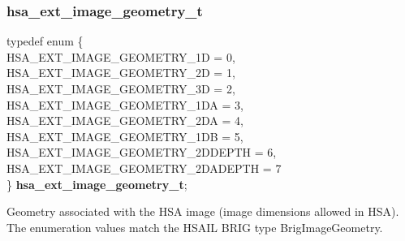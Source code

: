 \documentclass[final]{book}
\newcommand{\reftyp}[1]{#1}
\newcommand{\refenu}[1]{\reftyp{#1}}
\newenvironment{mylongtable}{\rowcolors{0}{lightgray}{lightgray}\longtable} {
\endlongtable}
\begin{document}
\subsubsection{hsa_\-ext_\-image_\-geometry_\-t}
\vspace{-5.5mm}\begin{mylongtable}{@{}p{\textwidth}}
\rule{0pt}{3ex}typedef enum \{\\\hspace{1.7em}\hypertarget{group__ext-images_1ggac61587d98a80d1660378e3904a66fc9caa025ea993dbfe3101d3ff0caea2ea0cf}{\refenu{HSA_\-EXT_\-IMAGE_\-GEOMETRY_\-1D}} = 0,\\
\hspace{1.7em}\hypertarget{group__ext-images_1ggac61587d98a80d1660378e3904a66fc9ca4bcc28ccad5a32bd9c9dbf203da4464e}{\refenu{HSA_\-EXT_\-IMAGE_\-GEOMETRY_\-2D}} = 1,\\
\hspace{1.7em}\hypertarget{group__ext-images_1ggac61587d98a80d1660378e3904a66fc9ca2e749b6b96377b9a744fc837296e318c}{\refenu{HSA_\-EXT_\-IMAGE_\-GEOMETRY_\-3D}} = 2,\\
\hspace{1.7em}\hypertarget{group__ext-images_1ggac61587d98a80d1660378e3904a66fc9cad989c8e619b376dc98ac3950be9afa33}{\refenu{HSA_\-EXT_\-IMAGE_\-GEOMETRY_\-1DA}} = 3,\\
\hspace{1.7em}\hypertarget{group__ext-images_1ggac61587d98a80d1660378e3904a66fc9ca90929e69cbf0b447060e1aeb23fd6dd4}{\refenu{HSA_\-EXT_\-IMAGE_\-GEOMETRY_\-2DA}} = 4,\\
\hspace{1.7em}\hypertarget{group__ext-images_1ggac61587d98a80d1660378e3904a66fc9ca47b208990ed715c37071f1fff17e812c}{\refenu{HSA_\-EXT_\-IMAGE_\-GEOMETRY_\-1DB}} = 5,\\
\hspace{1.7em}\hypertarget{group__ext-images_1ggac61587d98a80d1660378e3904a66fc9caf1f195107c114c7235275f047d2f0474}{\refenu{HSA_\-EXT_\-IMAGE_\-GEOMETRY_\-2DDEPTH}} = 6,\\
\hspace{1.7em}\hypertarget{group__ext-images_1ggac61587d98a80d1660378e3904a66fc9caf3d5440659a9dfd7892da13c1fe992bd}{\refenu{HSA_\-EXT_\-IMAGE_\-GEOMETRY_\-2DADEPTH}} = 7\\
\} \hypertarget{group__ext-images_1gac61587d98a80d1660378e3904a66fc9c}{\textbf{hsa_\-ext_\-image_\-geometry_\-t}};\rule[-2ex]{0pt}{0pt}\end{mylongtable}
\vspace{-2mm}Geometry associated with the HSA image (image dimensions allowed in HSA). The enumeration values match the HSAIL BRIG type BrigImageGeometry.
\end{document}

